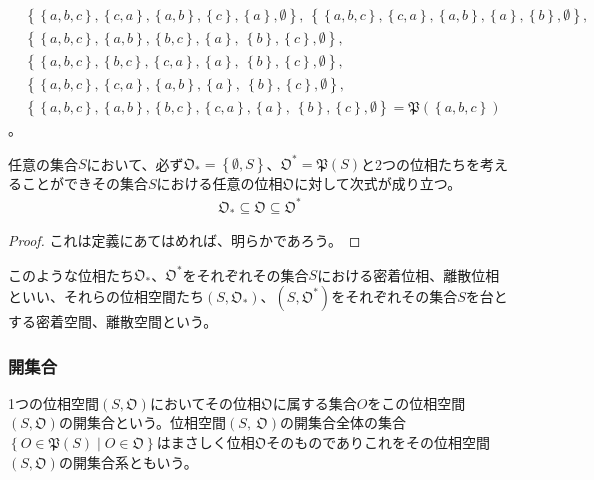 \documentclass[dvipdfmx]{jsarticle}
\begin{document}
{\begin{align*}
&\left\{ \left\{ a,b,c \right\},\left\{ c,a \right\},\left\{ a,b \right\},\left\{ c \right\},\left\{ a \right\},\emptyset \right\},\ \left\{ \left\{ a,b,c \right\},\left\{ c,a \right\},\left\{ a,b \right\},\left\{ a \right\},\left\{ b \right\},\emptyset \right\},\\
&\left\{ \left\{ a,b,c \right\},\left\{ a,b \right\},\left\{ b,c \right\},\left\{ a \right\},\ \left\{ b \right\},\left\{ c \right\},\emptyset \right\},\\
&\left\{ \left\{ a,b,c \right\},\left\{ b,c \right\},\left\{ c,a \right\},\left\{ a \right\},\ \left\{ b \right\},\left\{ c \right\},\emptyset \right\},\\ 
&\left\{ \left\{ a,b,c \right\},\left\{ c,a \right\},\left\{ a,b \right\},\left\{ a \right\},\ \left\{ b \right\},\left\{ c \right\},\emptyset \right\},\\
&\left\{ \left\{ a,b,c \right\},\left\{ a,b \right\},\left\{ b,c \right\},\left\{ c,a \right\},\left\{ a \right\},\ \left\{ b \right\},\left\{ c \right\},\emptyset \right\} =\mathfrak{P}\left( \left\{ a,b,c \right\} \right)
\end{align*}
}。
\begin{thm}\label{8.1.1.1}
任意の集合$S$において、必ず$\mathfrak{O}_{*} = \left\{ \emptyset,S \right\}$、$\mathfrak{O}^{*}=\mathfrak{P}(S)$と2つの位相たちを考えることができその集合$S$における任意の位相$\mathfrak{O}$に対して次式が成り立つ。
\begin{align*}
\mathfrak{O}_{*}\subseteq \mathfrak{O \subseteq}\mathfrak{O}^{*}
\end{align*}
\end{thm}
\begin{proof} これは定義にあてはめれば、明らかであろう。
\end{proof}
\begin{dfn}
このような位相たち$\mathfrak{O}_{*}$、$\mathfrak{O}^{*}$をそれぞれその集合$S$における密着位相、離散位相といい、それらの位相空間たち$\left( S,\mathfrak{O}_{*} \right)$、$\left( S,\mathfrak{O}^{*} \right)$をそれぞれその集合$S$を台とする密着空間、離散空間という。
\end{dfn}
\subsubsection{開集合}%
\begin{dfn}
1つの位相空間$\left( S,\mathfrak{O} \right)$においてその位相$\mathfrak{O}$に属する集合$O$をこの位相空間$\left( S,\mathfrak{O} \right)$の開集合という。位相空間$(S,\ \mathfrak{O})$の開集合全体の集合$\left\{ O \in \mathfrak{P}(S) \middle| O \in \mathfrak{O} \right\}$はまさしく位相$\mathfrak{O}$そのものでありこれをその位相空間$(S,\mathfrak{O})$の開集合系ともいう。
\end{dfn}
\end{document}

